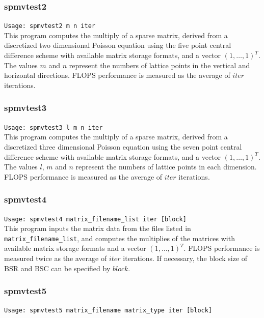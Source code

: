 \documentclass[a4paper]{article}
\begin{document}
\subsubsection{spmvtest2}

\verb+Usage: spmvtest2 m n iter+\\

This program computes the multiply of a sparse matrix, derived from a 
discretized two dimensional Poisson equation using 
the five point central difference scheme 
with available matrix storage formats, and a vector $(1,\dots,1)^T$. 
The values $m$ and $n$ represent the numbers of lattice points in the 
vertical and horizontal directions. 
FLOPS performance is measured as the average of $iter$ iterations. 

\subsubsection{spmvtest3}

\verb+Usage: spmvtest3 l m n iter+\\

This program computes the multiply of a sparse matrix, derived from a 
discretized three dimensional Poisson equation using 
the seven point central difference scheme 
with available matrix storage formats, and a vector $(1,\dots,1)^T$. 
The values $l$, $m$ and $n$ represent the numbers of lattice
points in each dimension. 
FLOPS performance is measured as the average of $iter$ iterations. 

\subsubsection{spmvtest4}

\verb+Usage: spmvtest4 matrix_filename_list iter [block]+\\

This program inputs the matrix data from the files listed in {\tt matrix\_filename\_list}, 
and computes the multiplies of the matrices with available matrix 
storage formats and a vector $(1,\dots,1)^T$. 
FLOPS performance is measured twice as the average of $iter$
iterations. 
If necessary, the block size of BSR and BSC can be specified by $block$.

\subsubsection{spmvtest5}

\verb+Usage: spmvtest5 matrix_filename matrix_type iter [block]+\\
\end{document}
